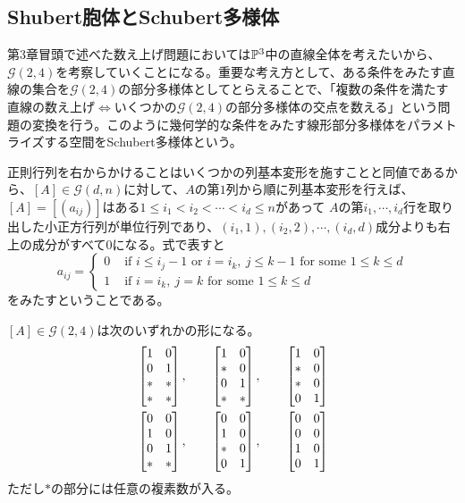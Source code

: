\documentclass{ltjsreport}
\begin{document}
\subsection{Shubert胞体とSchubert多様体}

第3章冒頭で述べた数え上げ問題においては$\mathbb{P}^3$中の直線全体を考えたいから、$\mathcal{G}(2,4)$を考察していくことになる。重要な考え方として、ある条件をみたす直線の集合を$\mathcal{G}(2,4)$の部分多様体としてとらえることで、「複数の条件を満たす直線の数え上げ$\Leftrightarrow$いくつかの$\mathcal{G}(2,4)$の部分多様体の交点を数える」という問題の変換を行う。このように幾何学的な条件をみたす線形部分多様体をパラメトライズする空間をSchubert多様体という。




正則行列を右からかけることはいくつかの列基本変形を施すことと同値であるから、$[A]\in\mathcal{G}(d,n)$に対して、$A$の第$1$列から順に列基本変形を行えば、$[A]=[(a_{ij})]$はある$1\leq i_1<i_2<\cdots<i_d\leq n$があって
$A$の第$i_1,\cdots,i_d$行を取り出した小正方行列が単位行列であり、$(i_1,1),(i_2,2),\cdots,(i_d,d)$成分よりも右上の成分がすべて$0$になる。式で表すと
\begin{equation}\label{schubertcell}
a_{ij}=\left\{\begin{array}{cl}
  0 & \text{ if } i \leq i_{j}-1 \text{ or } i=i_k,\: j\leq k-1 \text{ for some $1\leq k\leq d$}\\
  1 & \text{ if } i = i_k,\: j = k \text{ for some $1\leq k\leq d$}
\end{array}\right.  
\end{equation}
をみたすということである。

\begin{eg}
  $[A]\in\mathcal{G}(2,4)$は次のいずれかの形になる。
  \begin{align*}
    &\begin{bmatrix} 
      1 & 0\\
      0 & 1\\
      * & *\\
      * & *
     \end{bmatrix},\qquad 
    \begin{bmatrix} 
      1 & 0\\
      * & 0\\
      0 & 1\\
      * & *
     \end{bmatrix},\qquad
    \begin{bmatrix} 
      1 & 0\\
      * & 0\\
      * & 0\\
      0 & 1
     \end{bmatrix}\\
    &\begin{bmatrix} 
      0 & 0\\
      1 & 0\\
      0 & 1\\
      * & *
     \end{bmatrix},\qquad
    \begin{bmatrix} 
      0 & 0\\
      1 & 0\\
      * & 0\\
      0 & 1
     \end{bmatrix},\qquad
    \begin{bmatrix} 
      0 & 0\\
      0 & 0\\
      1 & 0\\
      0 & 1
     \end{bmatrix}
  \end{align*}
  ただし$*$の部分には任意の複素数が入る。
\end{eg}
\end{document}
